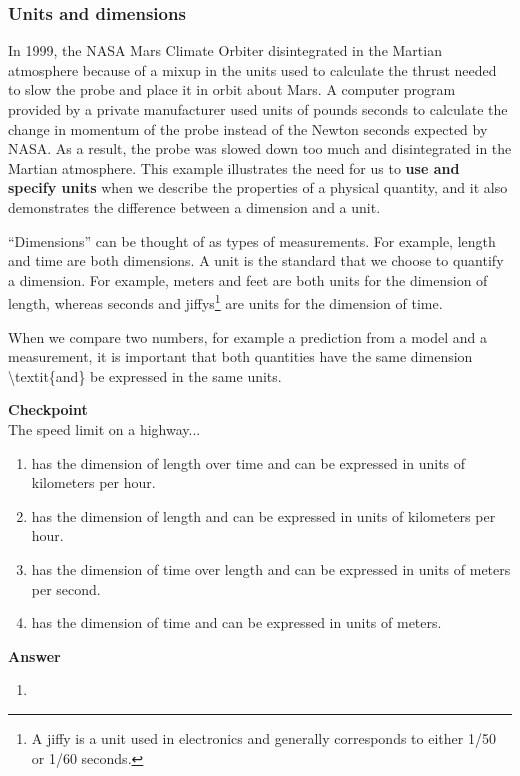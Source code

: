 \subsubsection{Units and dimensions}

In 1999, the NASA Mars Climate Orbiter disintegrated in the Martian atmosphere because of a mixup in the units used to calculate the thrust needed to slow the probe and place it in orbit about Mars. A computer program provided by a private manufacturer used units of pounds seconds to calculate the change in momentum of the probe instead of the Newton seconds expected by NASA. As a result, the probe was slowed down too much and disintegrated in the Martian atmosphere. This example illustrates the need for us to \textbf{use and specify units} when we describe the properties of a physical quantity, and it also demonstrates the difference between a dimension and a unit.

``Dimensions'' can be thought of as types of measurements. For example, length and time are both dimensions. A unit is the standard that we choose to quantify a dimension. For example, meters and feet are both units for the dimension of length, whereas seconds and jiffys\footnote{A jiffy is a unit used in electronics and generally corresponds to either 1/50 or 1/60 seconds.} are units for the dimension of time.

When we compare two numbers, for example a prediction from a model and a measurement, it is important that both quantities have the same dimension {\textbackslash}textit\{and\} be expressed in the same units.

\begin{framed}
\textbf{Checkpoint}\\
The speed limit on a highway...

\begin{enumerate}
\item has the dimension of length over time and can be expressed in units of kilometers per hour.
\item has the dimension of length and can be expressed in units of kilometers per hour.
\item has the dimension of time over length and can be expressed in units of meters per second.
\item has the dimension of time and can be expressed in units of meters.
\end{enumerate}

\begin{framed}
\textbf{Answer}\\
\begin{enumerate}
\item
\end{enumerate}
\end{framed}
\end{framed}


